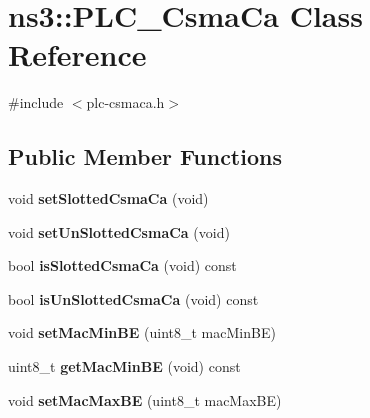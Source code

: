 \hypertarget{classns3_1_1PLC__CsmaCa}{\section{ns3\-:\-:\-P\-L\-C\-\_\-\-Csma\-Ca \-Class \-Reference}
\label{classns3_1_1PLC__CsmaCa}
}


{\ttfamily \#include $<$plc-\/csmaca.\-h$>$}

\subsection*{\-Public \-Member \-Functions}
\begin{DoxyCompactItemize}
\item 
\hypertarget{classns3_1_1PLC__CsmaCa_a0553db006ee71564a8f2dc0e8a87619c}{void {\bfseries set\-Slotted\-Csma\-Ca} (void)}\label{classns3_1_1PLC__CsmaCa_a0553db006ee71564a8f2dc0e8a87619c}

\item 
\hypertarget{classns3_1_1PLC__CsmaCa_af8e466024142e03a21eb2f355f777607}{void {\bfseries set\-Un\-Slotted\-Csma\-Ca} (void)}\label{classns3_1_1PLC__CsmaCa_af8e466024142e03a21eb2f355f777607}

\item 
\hypertarget{classns3_1_1PLC__CsmaCa_ac28e6f75ca631386df35dcbd4d6a5570}{bool {\bfseries is\-Slotted\-Csma\-Ca} (void) const }\label{classns3_1_1PLC__CsmaCa_ac28e6f75ca631386df35dcbd4d6a5570}

\item 
\hypertarget{classns3_1_1PLC__CsmaCa_abc9a7167a229b5fdac9096df1d6c9b2f}{bool {\bfseries is\-Un\-Slotted\-Csma\-Ca} (void) const }\label{classns3_1_1PLC__CsmaCa_abc9a7167a229b5fdac9096df1d6c9b2f}

\item 
\hypertarget{classns3_1_1PLC__CsmaCa_a93b961c5d327f20d88373d363bdcb9b6}{void {\bfseries set\-Mac\-Min\-B\-E} (uint8\-\_\-t mac\-Min\-B\-E)}\label{classns3_1_1PLC__CsmaCa_a93b961c5d327f20d88373d363bdcb9b6}

\item 
\hypertarget{classns3_1_1PLC__CsmaCa_aa28a39c727e6c40e846164f12d79ec05}{uint8\-\_\-t {\bfseries get\-Mac\-Min\-B\-E} (void) const }\label{classns3_1_1PLC__CsmaCa_aa28a39c727e6c40e846164f12d79ec05}

\item 
\hypertarget{classns3_1_1PLC__CsmaCa_aa6220a2a6d02f755e2fa2e3bb5032724}{void {\bfseries set\-Mac\-Max\-B\-E} (uint8\-\_\-t mac\-Max\-B\-E)}\label{classns3_1_1PLC__CsmaCa_aa6220a2a6d02f755e2fa2e3bb5032724}


\end{DoxyCompactItemize}
